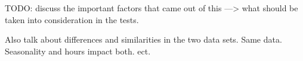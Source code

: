 TODO: discuss the important factors that came out of this ---> what should be taken into consideration in the tests.

Also talk about differences and similarities in the two data sets. Same data. Seasonality and hours impact both. ect.